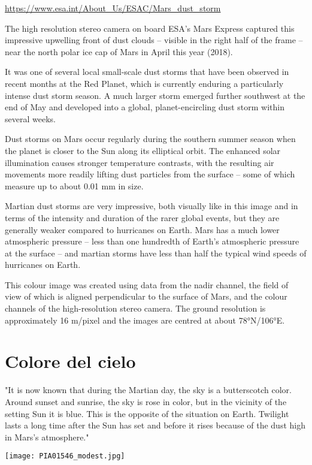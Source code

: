 \documentclass[a4paper,10pt,openany,oneside]{memoir}
\begin{document}
\url{https://www.esa.int/About_Us/ESAC/Mars_dust_storm}

The high resolution stereo camera on board ESA’s Mars Express captured this impressive upwelling front of dust clouds – visible in the right half of the frame – near the north polar ice cap of Mars in April this year (2018).

It was one of several local small-scale dust storms that have been observed in recent months at the Red Planet, which is currently enduring a particularly intense dust storm season. A much larger storm emerged further southwest at the end of May and developed into a global, planet-encircling dust storm within several weeks.

Dust storms on Mars occur regularly during the southern summer season when the planet is closer to the Sun along its elliptical orbit. The enhanced solar illumination causes stronger temperature contrasts, with the resulting air movements more readily lifting dust particles from the surface – some of which measure up to about 0.01 mm in size.

Martian dust storms are very impressive, both visually like in this image and in terms of the intensity and duration of the rarer global events, but they are generally weaker compared to hurricanes on Earth. Mars has a much lower atmospheric pressure – less than one hundredth of Earth’s atmospheric pressure at the surface – and martian storms have less than half the typical wind speeds of hurricanes on Earth.

This colour image was created using data from the nadir channel, the field of view of which is aligned perpendicular to the surface of Mars, and the colour channels of the high-resolution stereo camera. The ground resolution is approximately 16 m/pixel and the images are centred at about 78°N/106°E.



\section{Colore del cielo}

"It is now known that during the Martian day, the sky is a butterscotch color. Around sunset and sunrise, the sky is rose in color, but in the vicinity of the setting Sun it is blue. This is the opposite of the situation on Earth. Twilight lasts a long time after the Sun has set and before it rises because of the dust high in Mars's atmosphere."

\texttt{[image: PIA01546\_modest.jpg]}
\end{document}
